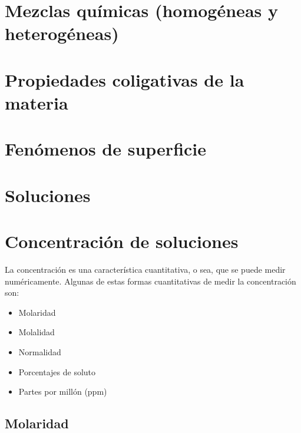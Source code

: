 


\section{Mezclas químicas (homogéneas y heterogéneas)}



\section{Propiedades coligativas de la materia}



\section{Fenómenos de superficie}



\section{Soluciones}



\section{Concentración de soluciones}

La concentración es una característica cuantitativa, o sea, que se puede medir numéricamente. Algunas de estas formas cuantitativas de medir la concentración son:

\begin{itemize}
    \item Molaridad
    \item Molalidad
    \item Normalidad
    \item Porcentajes de soluto
    \item Partes por millón (ppm)
\end{itemize}

\subsection{Molaridad}


